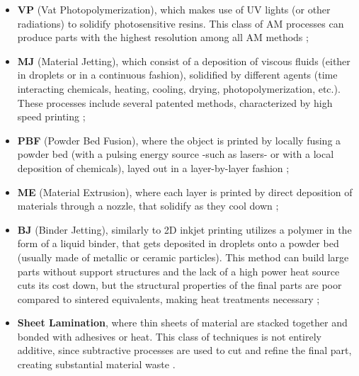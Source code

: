 \documentclass{article}
\begin{document}
    \begin{itemize}
        \item \textbf{VP} (Vat Photopolymerization), which makes use of UV lights (or other radiations) to solidify photosensitive resins. This class of AM processes can produce 
                        parts with the highest resolution among all AM methods \autocites*{Recent_progress_polymers_AM}{Kovalcik_PHA_Review};
        \item \textbf{MJ} (Material Jetting), which consist of a deposition of viscous fluids (either in droplets or in a continuous fashion), solidified by different agents 
                            (time interacting chemicals, heating, cooling, drying, photopolymerization, etc.). These processes include several patented methods, characterized by 
                            high speed printing \autocite*{Recent_progress_polymers_AM};
        \item \textbf{PBF} (Powder Bed Fusion), where the object is printed by locally fusing a powder bed (with a pulsing energy source -such as lasers- or with a local deposition of chemicals),
                            layed out in a layer-by-layer fashion \autocites*{Recent_progress_polymers_AM}{Kovalcik_PHA_Review};
        \item \textbf{ME} (Material Extrusion), where each layer is printed by direct deposition of materials through a nozzle, that solidify as they cool down \autocites*{Recent_progress_polymers_AM}{Kovalcik_PHA_Review};
        \item \textbf{BJ} (Binder Jetting), similarly to 2D inkjet printing utilizes a
                        polymer in the form of a liquid binder, that gets deposited in droplets onto a powder bed (usually made of metallic or ceramic particles). This 
                        method can build large parts without support structures and the lack of a high power heat source cuts its cost down, but the structural 
                        properties of the final parts are poor compared to sintered equivalents, making heat treatments necessary \autocite*{Recent_progress_polymers_AM};
        \item \textbf{Sheet Lamination}, where thin sheets of material are stacked together and bonded with adhesives or heat. This class of techniques 
                        is not entirely additive, since subtractive processes are used to cut and refine the final part, creating substantial material waste \autocite*{Recent_progress_polymers_AM}.
    \end{itemize} \clearpage
\end{document}
